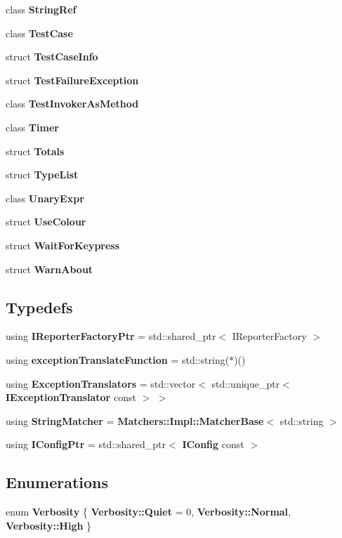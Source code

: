 \begin{DoxyCompactItemize}
\item 
class \textbf{ String\+Ref}
\item 
class \textbf{ Test\+Case}
\item 
struct \textbf{ Test\+Case\+Info}
\item 
struct \textbf{ Test\+Failure\+Exception}
\item 
class \textbf{ Test\+Invoker\+As\+Method}
\item 
class \textbf{ Timer}
\item 
struct \textbf{ Totals}
\item 
struct \textbf{ Type\+List}
\item 
class \textbf{ Unary\+Expr}
\item 
struct \textbf{ Use\+Colour}
\item 
struct \textbf{ Wait\+For\+Keypress}
\item 
struct \textbf{ Warn\+About}
\end{DoxyCompactItemize}
\subsection*{Typedefs}
\begin{DoxyCompactItemize}
\item 
using \textbf{ I\+Reporter\+Factory\+Ptr} = std\+::shared\+\_\+ptr$<$ I\+Reporter\+Factory $>$
\item 
using \textbf{ exception\+Translate\+Function} = std\+::string($\ast$)()
\item 
using \textbf{ Exception\+Translators} = std\+::vector$<$ std\+::unique\+\_\+ptr$<$ \textbf{ I\+Exception\+Translator} const  $>$ $>$
\item 
using \textbf{ String\+Matcher} = \textbf{ Matchers\+::\+Impl\+::\+Matcher\+Base}$<$ std\+::string $>$
\item 
using \textbf{ I\+Config\+Ptr} = std\+::shared\+\_\+ptr$<$ \textbf{ I\+Config} const  $>$
\end{DoxyCompactItemize}
\subsection*{Enumerations}
\begin{DoxyCompactItemize}
\item 
enum \textbf{ Verbosity} \{ \textbf{ Verbosity\+::\+Quiet} = 0, 
\textbf{ Verbosity\+::\+Normal}, 
\textbf{ Verbosity\+::\+High}
 \}
\end{DoxyCompactItemize}
